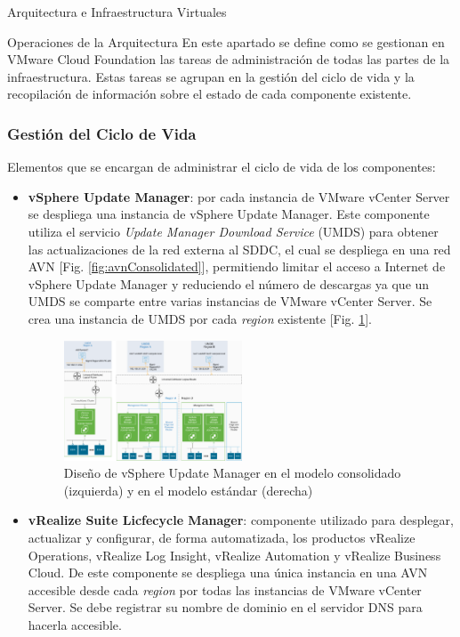 \begin{subsection}{Arquitectura e Infraestructura Virtuales\cite{CFVirtInfraes}}
\fi
\end{subsection}


\begin{subsection}{Operaciones de la Arquitectura\cite{CFopermanagement}}
En este apartado se define como se gestionan en VMware Cloud Foundation las tareas de administración de todas las partes de la infraestructura. Estas tareas se agrupan en la gestión del ciclo de vida y la recopilación de información sobre el estado de cada componente existente.

\subsubsection{Gestión del Ciclo de Vida}
Elementos que se encargan de administrar el ciclo de vida de los componentes:
\begin{itemize}
    \item \textbf{vSphere Update Manager}: por cada instancia de VMware vCenter Server se despliega una instancia de vSphere Update Manager. Este componente utiliza el servicio \textit{Update Manager Download Service} (UMDS) para obtener las actualizaciones de la red externa al SDDC, el cual se despliega en una red AVN [Fig. \ref{fig:avnConsolidated}], permitiendo limitar el acceso a Internet de vSphere Update Manager y reduciendo el número de descargas ya que un UMDS se comparte entre varias instancias de VMware vCenter Server. Se crea una instancia de UMDS por cada \textit{region} existente [Fig. \ref{fig:UpdateManagerArc}].
    \begin{figure}[h!]
        \centering
        \includegraphics[width=0.5\textwidth]{imaxes/conceptosPrevios/UpdateManagerArch.png}
        \caption{Diseño de vSphere Update Manager en el modelo consolidado (izquierda) y en el modelo estándar (derecha)}
        \label{fig:UpdateManagerArc}
    \end{figure}
    \FloatBarrier
    
    \item \textbf{vRealize Suite Licfecycle Manager}: componente utilizado para desplegar, actualizar y configurar, de forma automatizada, los productos vRealize Operations, vRealize Log Insight, vRealize Automation y vRealize Business Cloud. De este componente se despliega una única instancia en una AVN accesible desde cada \textit{region} por todas las instancias de VMware vCenter Server. Se debe registrar su nombre de dominio en el servidor DNS para hacerla accesible.
    

\end{itemize}
\end{subsection}
